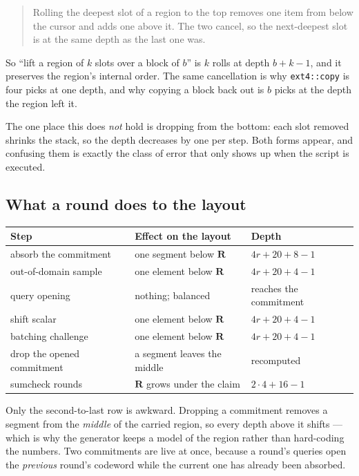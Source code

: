 \documentclass[11pt,a4paper]{article}
\begin{document}
\begin{quote}
Rolling the deepest slot of a region to the top removes one item from below the cursor and adds one
above it. The two cancel, so the next-deepest slot is at the same depth as the last one was.
\end{quote}

So ``lift a region of $k$ slots over a block of $b$'' is $k$ rolls at depth $b+k-1$, and it preserves
the region's internal order. The same cancellation is why \texttt{ext4::copy} is four picks at one
depth, and why copying a block back out is $b$ picks at the depth the region left it.

The one place this does \emph{not} hold is dropping from the bottom: each slot removed shrinks the
stack, so the depth decreases by one per step. Both forms appear, and confusing them is exactly the
class of error that only shows up when the script is executed.

\subsection*{What a round does to the layout}

\begin{center}\small
\begin{tabular}{@{}lll@{}}
\toprule
\textbf{Step} & \textbf{Effect on the layout} & \textbf{Depth} \\
\midrule
absorb the commitment & one segment below $\boldsymbol R$ & $4r+20+8-1$\\
out-of-domain sample & one element below $\boldsymbol R$ & $4r+20+4-1$\\
query opening & nothing; balanced & reaches the commitment\\
shift scalar & one element below $\boldsymbol R$ & $4r+20+4-1$\\
batching challenge & one element below $\boldsymbol R$ & $4r+20+4-1$\\
drop the opened commitment & a segment leaves the middle & recomputed\\
sumcheck rounds & $\boldsymbol R$ grows under the claim & $2\cdot4+16-1$\\
\bottomrule
\end{tabular}
\end{center}

Only the second-to-last row is awkward. Dropping a commitment removes a segment from the
\emph{middle} of the carried region, so every depth above it shifts --- which is why the generator
keeps a model of the region rather than hard-coding the numbers. Two commitments are live at once,
because a round's queries open the \emph{previous} round's codeword while the current one has already
been absorbed.
\end{document}
